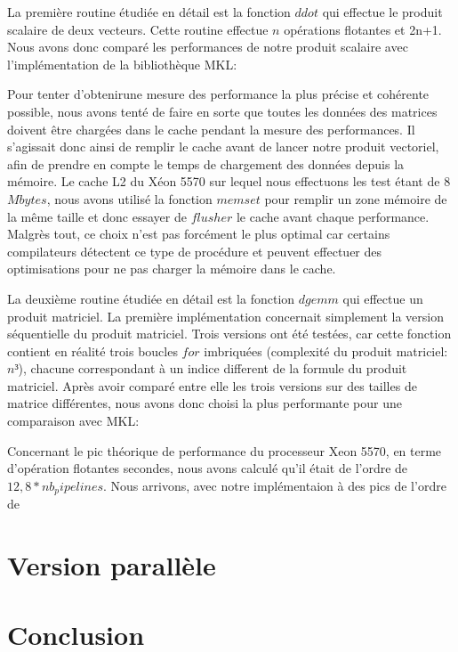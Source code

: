 \documentclass[a4paper,11pt]{article}
\begin{document}
La première routine étudiée en détail est la fonction $ddot$ qui effectue le produit scalaire de deux vecteurs. Cette routine effectue $n$ opérations flotantes et 2n+1. Nous avons donc comparé les performances de notre produit scalaire avec l'implémentation de la bibliothèque MKL:

Pour tenter d'obtenirune mesure des performance la plus précise et cohérente possible, nous avons tenté de faire en sorte que toutes les données des matrices doivent être chargées dans le cache pendant la mesure des performances. Il s'agissait donc ainsi de remplir le cache avant de lancer notre produit vectoriel, afin de prendre en compte le temps de chargement des données depuis la mémoire. Le cache L2 du Xéon 5570 sur lequel nous effectuons les test étant de 8 $Mbytes$, nous avons utilisé la fonction $memset$ pour remplir un zone mémoire de la même taille et donc essayer de $flusher$ le cache avant chaque performance. Malgrès tout, ce choix n'est pas forcément le plus optimal car certains compilateurs détectent ce type de procédure et peuvent effectuer des optimisations pour ne pas charger la mémoire dans le cache.


La deuxième routine étudiée en détail est la fonction $dgemm$ qui effectue un produit matriciel. La première implémentation concernait simplement la version séquentielle du produit matriciel. Trois versions ont été testées, car cette fonction contient en réalité trois boucles $for$ imbriquées (complexité du produit matriciel: $n³$), chacune correspondant à un indice different de la formule du produit matriciel. Après avoir comparé entre elle les trois versions sur des tailles de matrice différentes, nous avons donc choisi la plus performante pour une comparaison avec MKL:


Concernant le pic théorique de performance du processeur Xeon 5570, en terme d'opération flotantes secondes, nous avons calculé qu'il était de l'ordre de $12,8 * nb_pipelines$. Nous arrivons, avec notre implémentaion à des pics de l'ordre de %

\section{Version parallèle}

\section{Conclusion}
\end{document}

